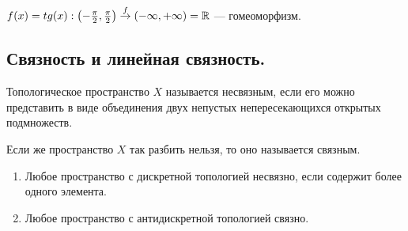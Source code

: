 \begin{example}
    $f(x) = tg(x) : \left(-\frac{\pi}{2}, \frac{\pi}{2}\right) \overset{f}{\rightarrow} \left(-\infty, +\infty\right) = \mathbb{R}$ --- гомеоморфизм.  
\end{example}

\subsection{Связность и линейная связность.}

\begin{definition}
    Топологическое пространство $X$ называется несвязным, если его можно представить в виде объединения двух непустых непересекающихся открытых подмножеств.

    Если же пространство $X$ так разбить нельзя, то оно называется связным.
\end{definition}

\begin{example} %
    \begin{enumerate}
        \item Любое пространство с дискретной топологией несвязно, если содержит более одного элемента.
        \item Любое пространство с антидискретной топологией связно.
    \end{enumerate}
\end{example}

